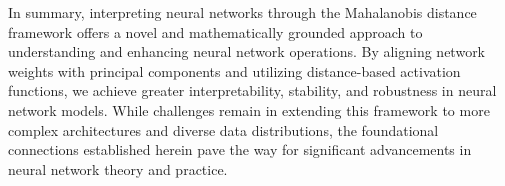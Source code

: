 In summary, interpreting neural networks through the Mahalanobis distance framework offers a novel and mathematically grounded approach to understanding and enhancing neural network operations. By aligning network weights with principal components and utilizing distance-based activation functions, we achieve greater interpretability, stability, and robustness in neural network models. While challenges remain in extending this framework to more complex architectures and diverse data distributions, the foundational connections established herein pave the way for significant advancements in neural network theory and practice.

